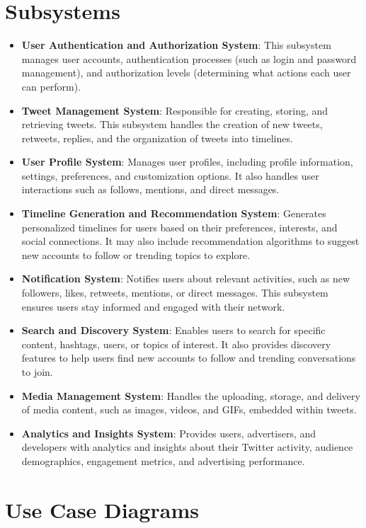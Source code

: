 \documentclass{article}
\begin{document}
\section{Subsystems}
\begin{itemize}[label=$\bullet$]
    \item \textbf{User Authentication and Authorization System}: This subsystem manages user accounts, authentication processes (such as login and password management), and authorization levels (determining what actions each user can perform).
    \item \textbf{Tweet Management System}: Responsible for creating, storing, and retrieving tweets. This subsystem handles the creation of new tweets, retweets, replies, and the organization of tweets into timelines.
    \item \textbf{User Profile System}: Manages user profiles, including profile information, settings, preferences, and customization options. It also handles user interactions such as follows, mentions, and direct messages.
    \item \textbf{Timeline Generation and Recommendation System}: Generates personalized timelines for users based on their preferences, interests, and social connections. It may also include recommendation algorithms to suggest new accounts to follow or trending topics to explore.
    \item \textbf{Notification System}: Notifies users about relevant activities, such as new followers, likes, retweets, mentions, or direct messages. This subsystem ensures users stay informed and engaged with their network.
    \item \textbf{Search and Discovery System}: Enables users to search for specific content, hashtags, users, or topics of interest. It also provides discovery features to help users find new accounts to follow and trending conversations to join.
    \item \textbf{Media Management System}: Handles the uploading, storage, and delivery of media content, such as images, videos, and GIFs, embedded within tweets.
    \item \textbf{Analytics and Insights System}: Provides users, advertisers, and developers with analytics and insights about their Twitter activity, audience demographics, engagement metrics, and advertising performance.
\end{itemize}

\section{Use Case Diagrams}
\end{document}
